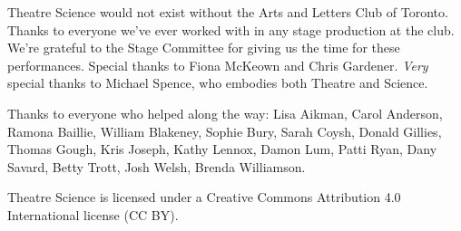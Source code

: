 Theatre Science would not exist without the Arts and Letters Club of Toronto.  Thanks to everyone we've ever worked with in any stage production at the club.  We're grateful to the Stage Committee for giving us the time for these performances.  Special thanks to Fiona McKeown and Chris Gardener.  \textit{Very} special thanks to Michael Spence, who embodies both Theatre and Science.

Thanks to everyone who helped along the way:  Lisa Aikman, Carol Anderson, Ramona Baillie, William Blakeney, Sophie Bury, Sarah Coysh, Donald Gillies, Thomas Gough, Kris Joseph, Kathy Lennox, Damon Lum, Patti Ryan, Dany Savard, Betty Trott, Josh Welsh, Brenda Williamson.

Theatre Science is licensed under a Creative Commons Attribution 4.0 International license (CC BY).  %
